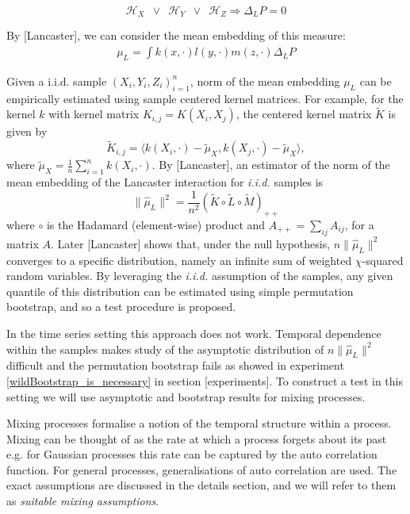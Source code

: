 \documentclass[]{article}
\begin{document}
\[\mathcal{H}_X \enspace \lor \enspace \mathcal{H}_Y \enspace \lor \enspace \mathcal{H}_Z \Rightarrow \Delta_LP=0 \]

By [Lancaster], we can consider the mean embedding of this measure:
\begin{align}
 \mu_L = \int k(x,\cdot) l(y,\cdot) m(z,\cdot) \Delta_LP 
\end{align}


Given a i.i.d. sample $(X_i,Y_i,Z_i)_{i=1}^n$,  norm of the mean embedding $\mu_L$ can be empirically estimated using sample centered kernel matrices. For example, for the kernel $k$ with kernel matrix $K_{i,j} = K(X_i,X_j)$, the centered kernel matrix  $\tilde{K}$ is given by
\[
\tilde{K}_{i,j} = \langle k(X_i,\cdot)-\tilde{\mu}_X, k(X_j,\cdot) -\tilde{\mu}_X \rangle,
\]
where $\tilde{\mu}_X = \frac{1}{n}\sum_{i=1}^n k(X_i,\cdot)$.  By [Lancaster], an estimator of the norm of the mean embedding of the Lancaster interaction for \emph{i.i.d.} samples is 
\begin{equation}\label{eqn:lancaster}
\|\hat \mu_L\|^2 = \frac{1}{n^2}\left(\tilde{K}\circ\tilde{L}\circ\tilde{M}\right)_{++}
\end{equation}
where $\circ$ is the Hadamard (element-wise) product and $A_{++} = \sum_{ij}A_{ij}$, for a matrix $A$. Later [Lancaster] shows that, under the null hypothesis, $n \|\hat \mu_L\|^2 $ converges to a specific distribution, namely an infinite sum of weighted $\chi$-squared random variables. By leveraging the \emph{i.i.d.} assumption of the samples, any given quantile of this  distribution  can be estimated using simple permutation bootstrap, and so a test procedure is proposed.

In the time series setting this approach does not work. Temporal dependence within the samples makes  study of the asymptotic distribution of $n \|\hat \mu_L\|^2 $ difficult and the permutation bootstrap fails as showed in experiment \ref{wildBootstrap_is_necessary} in section [experiments]. To construct a test in this setting we will use asymptotic and bootstrap results for mixing processes. 

Mixing processes formalise a notion of the temporal structure within a process. Mixing can be thought of as the rate at which a process forgets about its past e.g. for Gaussian processes this rate can be captured by the auto correlation function. For general processes, generalisations of auto correlation are used. The exact assumptions are discussed in the details section, and we will refer to them as \textit{suitable mixing assumptions}.   
\end{document}
